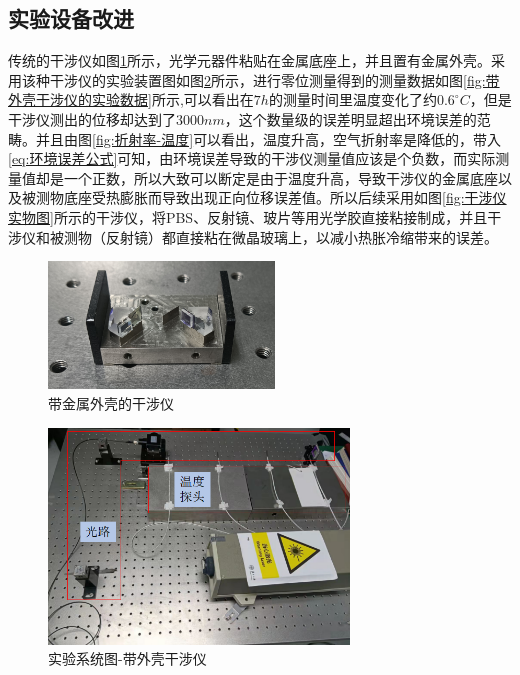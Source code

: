 \subsection{实验设备改进}
传统的干涉仪如图\ref{fig:带金属外壳的干涉仪}所示，光学元器件粘贴在金属底座上，并且置有金属外壳。采用该种干涉仪的实验装置图如图\ref{fig:实验系统图-带外壳干涉仪}所示，进行零位测量得到的测量数据如图\ref{fig:带外壳干涉仪的实验数据}所示,可以看出在$7h$的测量时间里温度变化了约$0.6^\circ C$，但是干涉仪测出的位移却达到了$3000nm$，这个数量级的误差明显超出环境误差的范畴。并且由图\ref{fig:折射率-温度}可以看出，温度升高，空气折射率是降低的，带入\eqref{eq:环境误差公式}可知，由环境误差导致的干涉仪测量值应该是个负数，而实际测量值却是一个正数，所以大致可以断定是由于温度升高，导致干涉仪的金属底座以及被测物底座受热膨胀而导致出现正向位移误差值。所以后续采用如图\ref{fig:干涉仪实物图}所示的干涉仪，将PBS、反射镜、玻片等用光学胶直接粘接制成，并且干涉仪和被测物（反射镜）都直接粘在微晶玻璃上，以减小热胀冷缩带来的误差。
\begin{figure}[htb]
    \centering
    \includegraphics[width=6cm]{fig/3-fig/带金属外壳的干涉仪.png}
    \caption{带金属外壳的干涉仪}
    \label{fig:带金属外壳的干涉仪}
\end{figure}
\begin{figure}[htb]
    \centering
    \includegraphics[width=8cm]{fig/3-fig/实验系统图-带外壳干涉仪.jpg}
    \caption{实验系统图-带外壳干涉仪}
    \label{fig:实验系统图-带外壳干涉仪}
\end{figure}
